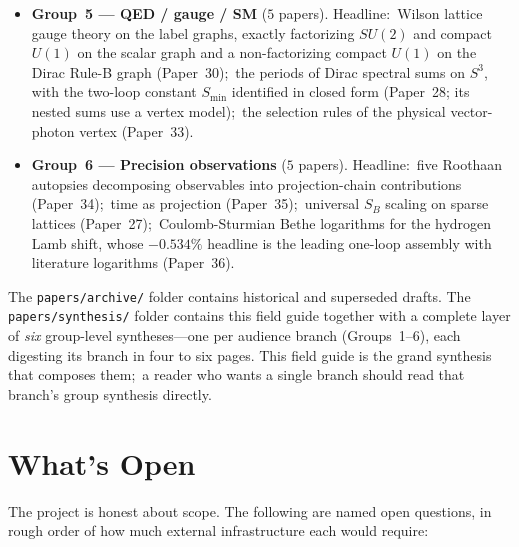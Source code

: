 \documentclass[11pt,a4paper]{article}
\newcommand{\sthree}{S^{3}}
\begin{document}
\begin{itemize}
    $76\times$ fewer than cc-pVDZ).
  \item \textbf{Group~5 --- QED / gauge / SM} ($5$ papers).
    Headline:\ Wilson lattice gauge theory on the label graphs, exactly
    factorizing $SU(2)$ and compact $U(1)$ on the scalar graph and a
    non-factorizing compact $U(1)$ on the Dirac Rule-B graph
    (Paper~30);\ the periods of Dirac spectral sums on $\sthree$, with
    the two-loop constant $S_{\min}$ identified in closed form (Paper~28;
    its nested sums use a vertex model);\ the selection rules of the
    physical vector-photon vertex (Paper~33).
  \item \textbf{Group~6 --- Precision observations} ($5$ papers).
    Headline:\ five Roothaan autopsies decomposing observables into
    projection-chain contributions (Paper~34);\ time as projection
    (Paper~35);\ universal $S_B$ scaling on sparse lattices
    (Paper~27);\ Coulomb-Sturmian Bethe logarithms for the hydrogen Lamb
    shift, whose $-0.534\%$ headline is the leading one-loop assembly with
    literature logarithms (Paper~36).
\end{itemize}

The \texttt{papers/archive/} folder contains historical and
superseded drafts.  The \texttt{papers/synthesis/} folder contains
this field guide together with a complete layer of \emph{six}
group-level syntheses---one per audience branch (Groups~1--6), each
digesting its branch in four to six pages.  This field guide is the
grand synthesis that composes them;\ a reader who wants a single
branch should read that branch's group synthesis directly.

\section{What's Open}
\label{sec:open}

The project is honest about scope.  The following are named open
questions, in rough order of how much external infrastructure each
would require:
\end{document}
